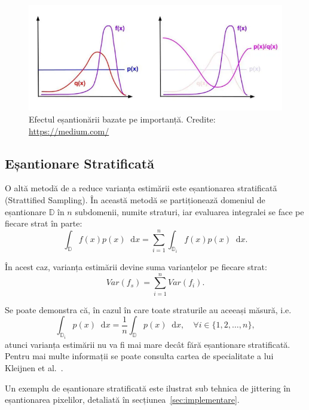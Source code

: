 \documentclass[12pt,a4paper]{report}
\newcommand*\diff{\mathop{}\!\mathrm{d}}
\numberwithin{equation}{section} %
\begin{document}
\begin{figure}[th]
	\centering
	\includegraphics[width=\textwidth]{pics/is.png}
	\caption{Efectul eșantionării bazate pe importanță. Credite: \url{https://medium.com/}}
	\label{fig:is}
\end{figure}

\subsection{Eșantionare Stratificată}

O altă metodă de a reduce varianța estimării este eșantionarea stratificată (Strattified Sampling).
În această metodă se partiționează domeniul de eșantionare $\mathbb{D}$ în $n$ subdomenii,
numite straturi, iar evaluarea integralei se face pe fiecare strat în parte:
\begin{equation}
	\int_{\mathbb{D}} f(x) p(x)\diff x = \sum_{i=1}^{n} \int_{\mathbb{D}_i} f(x) p(x)\diff x.
\end{equation}

În acest caz, varianța estimării devine suma varianțelor pe fiecare strat:
\begin{equation}
	Var(f_s) = \sum_{i=1}^{n} Var(f_i).
\end{equation}

Se poate demonstra că, în cazul în care toate straturile au aceeași măsură, i.e.
\begin{equation}
	\int_{\mathbb{D}_i} p(x)\diff x = \frac{1}{n}\int_{\mathbb{D}} p(x)\diff x, \quad \forall i \in \{1, 2, \ldots, n\},
\end{equation}
atunci varianța estimării nu va fi mai mare decât fără eșantionare stratificată.
Pentru mai multe informații se poate consulta cartea de specialitate a lui Kleijnen et al.~\cite{Kleijnen2013}.

Un exemplu de eșantionare stratificată este ilustrat sub tehnica de jittering
în eșantionarea pixelilor, detaliată în secțiunea~\ref{sec:implementare}.
\end{document}
